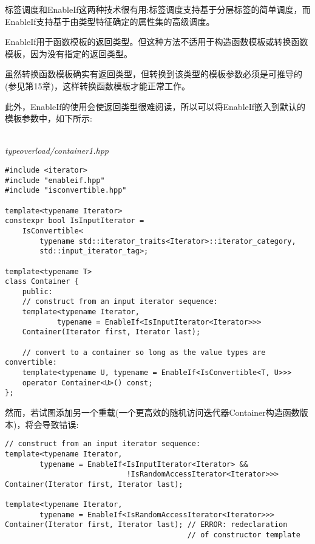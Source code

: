 标签调度和EnableIf这两种技术很有用:标签调度支持基于分层标签的简单调度，而EnableIf支持基于由类型特征确定的属性集的高级调度。


EnableIf用于函数模板的返回类型。但这种方法不适用于构造函数模板或转换函数模板，因为没有指定的返回类型。

\begin{tcolorbox}[colback=webgreen!5!white,colframe=webgreen!75!black]
\hspace*{0.75cm}虽然转换函数模板确实有返回类型，但转换到该类型的模板参数必须是可推导的(参见第15章)，这样转换函数模板才能正常工作。
\end{tcolorbox}

此外，EnableIf的使用会使返回类型很难阅读，所以可以将EnableIf嵌入到默认的模板参数中，如下所示:

\hspace*{\fill} \\ %
\noindent
\textit{typeoverload/container1.hpp}
\begin{lstlisting}[style=styleCXX]
#include <iterator>
#include "enableif.hpp"
#include "isconvertible.hpp"

template<typename Iterator>
constexpr bool IsInputIterator =
	IsConvertible<
		typename std::iterator_traits<Iterator>::iterator_category,
		std::input_iterator_tag>;

template<typename T>
class Container {
	public:
	// construct from an input iterator sequence:
	template<typename Iterator,
			typename = EnableIf<IsInputIterator<Iterator>>>
	Container(Iterator first, Iterator last);
	
	// convert to a container so long as the value types are convertible:
	template<typename U, typename = EnableIf<IsConvertible<T, U>>>
	operator Container<U>() const;
};
\end{lstlisting}

然而，若试图添加另一个重载(一个更高效的随机访问迭代器Container构造函数版本)，将会导致错误:

\begin{lstlisting}[style=styleCXX]
// construct from an input iterator sequence:
template<typename Iterator,
		typename = EnableIf<IsInputIterator<Iterator> &&
							!IsRandomAccessIterator<Iterator>>>
Container(Iterator first, Iterator last);

template<typename Iterator,
		typename = EnableIf<IsRandomAccessIterator<Iterator>>>
Container(Iterator first, Iterator last); // ERROR: redeclaration
										  // of constructor template
\end{lstlisting}

